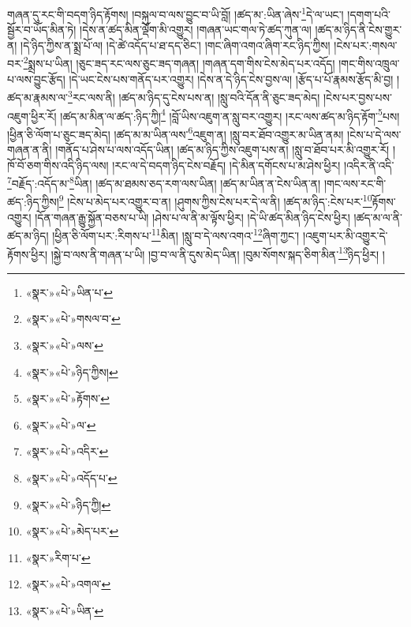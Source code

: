 གཞན་དུ་རང་གི་བདག་ཉིད་རྟོགས། །བསྐུལ་བ་ལས་བྱུང་བ་ཡི་བློ། །ཚད་མ་:ཡིན་ཞེས་\footnote{«སྣར་»«པེ་»ཡིན་པ་}དེ་ལ་ཡང་། །དགག་པའི་སྦྱོར་བ་ཡོད་མིན་ཏེ། །དེས་ན་ཚད་མིན་ལྡོག་མི་འགྱུར། །གཞན་ཡང་གལ་ཏེ་ཚད་ཀུན་ལ། །ཚད་མ་ཉིད་ནི་ངེས་གྱུར་ན། །དེ་ཉིད་ཀྱིས་ན་སྨྲ་པོ་ལ། །དེ་ཚེ་འདོད་པ་ཐ་དད་ཅིང་། །གང་ཞིག་འགའ་ཞིག་རང་ཉིད་ཀྱིས། །ངེས་པར་:གསལ་བར་\footnote{«སྣར་»«པེ་»གསལ་བ་}སྨྲས་པ་ཡིན། །ཅུང་ཟད་རང་ལས་ཅུང་ཟད་གཞན། །གཞན་དག་གིས་ངེས་མེད་པར་འདོད། །གང་གིས་འཁྲུལ་པ་ལས་བྱུང་རྩོད། །དེ་ཡང་ངེས་པས་གནོད་པར་འགྱུར། །དེས་ན་དེ་ཉིད་ངེས་བྱས་ལ། །རྩོད་པ་པོ་རྣམས་རྩོད་མི་བྱ། །ཚད་མ་རྣམས་ལ་\footnote{«སྣར་»«པེ་»ལས་}རང་ལས་ནི། །ཚད་མ་ཉིད་དུ་ངེས་པས་ན། །སླུ་བའི་དོན་ནི་ཅུང་ཟད་མེད། །ངེས་པར་བྱས་པས་འཇུག་ཕྱིར་རོ། །ཚད་མ་མིན་ལ་ཚད་:ཉིད་ཀྱི།\footnote{«སྣར་»«པེ་»ཉིད་ཀྱིས།} །བློ་ཡིས་འཇུག་ན་སླུ་བར་འགྱུར། །རང་ལས་ཚད་མ་ཉིད་རྟོག་\footnote{«སྣར་»«པེ་»རྟོགས་}པས། །ཕྱིན་ཅི་ལོག་པ་ཅུང་ཟད་མེད། །ཚད་མ་མ་ཡིན་ལས་\footnote{«སྣར་»«པེ་»ལ་}འཇུག་ན། །སླུ་བར་ཐོབ་འགྱུར་མ་ཡིན་ནམ། །ངེས་པ་དེ་ལས་གཞན་ན་ནི། །གནོད་པ་ཤེས་པ་ལས་འདོད་ཡིན། །ཚད་མ་ཉིད་ཀྱིས་འཇུག་པས་ན། །སླུ་བ་ཐོབ་པར་མི་འགྱུར་རོ། །ཁོ་བོ་ཅག་གིས་འདི་ཉིད་ལས། །རང་ལ་དེ་བདག་ཉིད་ངེས་བརྗོད། །དེ་མིན་དགོངས་པ་མ་ཤེས་ཕྱིར། །འདིར་ནི་འདི་\footnote{«སྣར་»«པེ་»འདིར་}བརྗོད་:འདོད་མ་\footnote{«སྣར་»«པེ་»འདོད་པ་}ཡིན། །ཚད་མ་ཐམས་ཅད་རག་ལས་ཡིན། །ཚད་མ་ཡིན་ན་ངེས་ཡིན་ན། །གང་ལས་རང་གི་ཚད་:ཉིད་ཀྱིས།\footnote{«སྣར་»«པེ་»ཉིད་ཀྱི།} །ངེས་པ་མེད་པར་འགྱུར་བ་ན། །ཤུགས་ཀྱིས་ངེས་པར་དེ་ལ་ནི། །ཚད་མ་ཉིད་:ངེས་པར་\footnote{«སྣར་»«པེ་»མེད་པར་}རྟོགས་འགྱུར། །དོན་གཞན་རྒྱུ་སྐྱོན་བཅས་པ་ཡི། །ཤེས་པ་ལ་ནི་མ་ལྟོས་ཕྱིར། །དེ་ཡི་ཚད་མིན་ཉིད་ངེས་ཕྱིར། །ཚད་མ་ལ་ནི་ཚད་མ་ཉིད། །ཕྱིན་ཅི་ལོག་པར་:རིགས་པ་\footnote{«སྣར་»རིག་པ་}མིན། །སླུ་བ་དེ་ལས་འགའ་\footnote{«སྣར་»«པེ་»འགལ་}ཞིག་ཀྱང་། །འཇུག་པར་མི་འགྱུར་དེ་རྟོགས་ཕྱིར། །སྐྱེ་བ་ལས་ནི་གཞན་པ་ཡི། །བྱ་བ་ལ་ནི་དུས་མེད་ཡིན། །བུམ་སོགས་སྐད་ཅིག་མིན་\footnote{«སྣར་»«པེ་»ཡིན་}ཉིད་ཕྱིར། །
